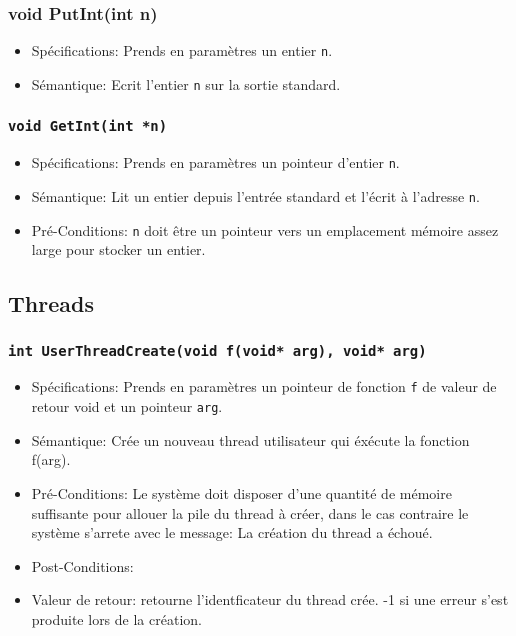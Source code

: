 \documentclass[11pt]{article}
\begin{document}
\subsubsection{void PutInt(int n)}
\begin{itemize}
\item[] Spécifications: Prends en paramètres un entier \texttt{n}.
\item[] Sémantique: Ecrit l'entier \texttt{n} sur la sortie standard.
\end{itemize}

\subsubsection{\texttt{void GetInt(int *n)}}
\begin{itemize}
\item[] Spécifications: Prends en paramètres un pointeur d'entier \texttt{n}.
\item[] Sémantique: Lit un entier depuis l'entrée standard et l'écrit à l'adresse \texttt{n}.
\item[] Pré-Conditions:
  \texttt{n} doit être un pointeur vers un emplacement mémoire assez large pour stocker un entier.
\end{itemize}





\subsection{Threads}

\subsubsection{\texttt{int UserThreadCreate(void f(void* arg), void* arg)}}
\begin{itemize}
\item[] Spécifications: Prends en paramètres un pointeur de fonction \texttt{f} de valeur de retour
  void et un pointeur \texttt{arg}.
\item[] Sémantique: Crée un nouveau thread utilisateur qui éxécute la fonction f(arg).
\item[] Pré-Conditions: Le système doit disposer d'une quantité de mémoire suffisante pour allouer la
  pile du thread à créer, dans le cas contraire le système s'arrete avec le message:
  La création du thread a échoué.
\item[] Post-Conditions: 
\item[] Valeur de retour: retourne l'identficateur du thread crée. -1 si une erreur s'est produite lors de
  la création.
\end{itemize}
\end{document}
